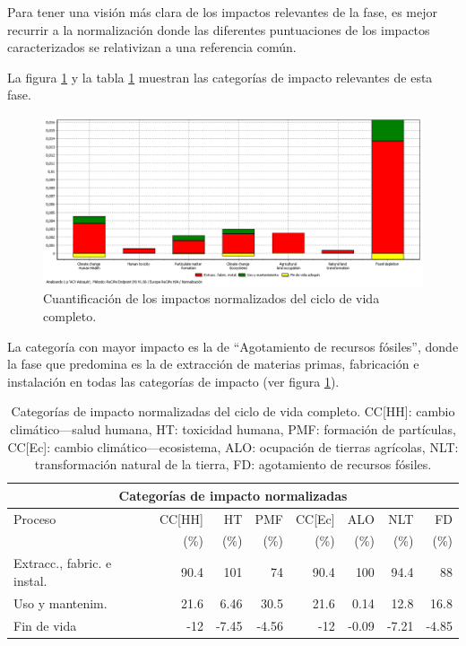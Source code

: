 Para tener una visión más clara de los impactos relevantes de la fase, es mejor recurrir a la normalización donde las diferentes puntuaciones de los impactos caracterizados se relativizan a una referencia común.

La figura \ref{fig:completo_normalizacion} y la tabla \ref{categoriasimpactocompleto} muestran las categorías de impacto relevantes de esta fase.

\begin{figure}[!htb]
\centering
\includegraphics[width=15cm]{img/completo_normalizacion.png}
\caption{Cuantificación de los impactos normalizados del ciclo de vida completo.}
\label{fig:completo_normalizacion}
\end{figure}

La categoría con mayor impacto es la de ``Agotamiento de recursos fósiles'', donde la fase que predomina es la de extracción de materias primas, fabricación e instalación en todas las categorías de impacto (ver figura \ref{fig:completo_normalizacion}).

\begin{table}[!htb]
\centering
\begin{tabular}{p{4cm}rrrrrrr}
\toprule
\multicolumn{8}{c}{Categorías de impacto normalizadas}\\
\midrule
Proceso & CC[HH] & HT & PMF & CC[Ec] & ALO & NLT & FD\\
 &  (\%) & (\%) & (\%) & (\%) & (\%) & (\%) & (\%)\\
\midrule
Extracc., fabric. e instal. & 90.4 & 101 & 74 & 90.4 & 100 & 94.4 & 88\\
Uso y mantenim. & 21.6 & 6.46 & 30.5 & 21.6 & 0.14 & 12.8 & 16.8\\
Fin de vida & -12 & -7.45 & -4.56 & -12 & -0.09 & -7.21 & -4.85\\
\bottomrule
\end{tabular}
\caption[Categorías de impacto normalizadas del ciclo de vida completo.]{Categorías de impacto normalizadas del ciclo de vida completo. CC[HH]: cambio climático—salud humana, HT: toxicidad humana, PMF: formación de partículas, CC[Ec]: cambio climático—ecosistema, ALO: ocupación de tierras agrícolas, NLT: transformación natural de la tierra, FD: agotamiento de recursos fósiles.}
\label{categoriasimpactocompleto}
\end{table}

